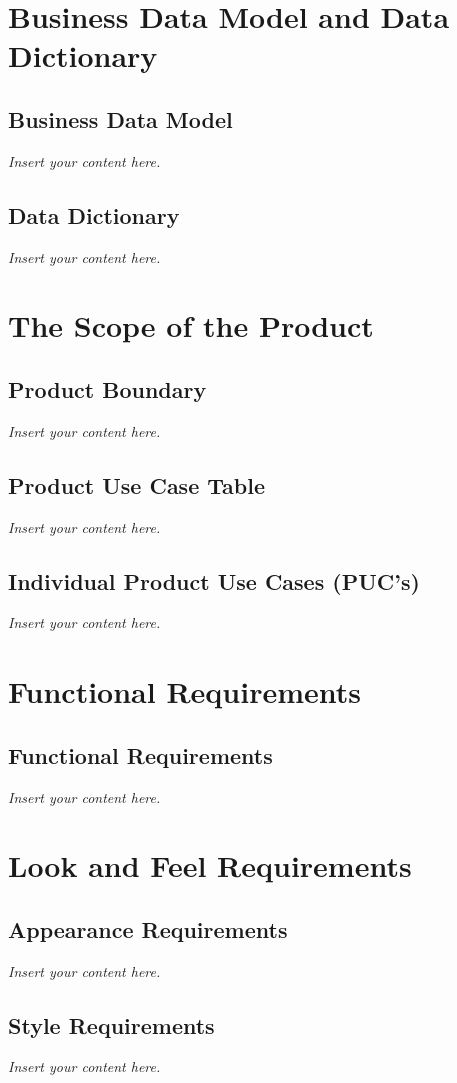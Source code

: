 \documentclass[12pt]{article}
\newcommand{\lips}{\textit{Insert your content here.}}
\begin{document}
\section{Business Data Model and Data Dictionary}
\subsection{Business Data Model}
\lips
\subsection{Data Dictionary}
\lips

\section{The Scope of the Product}
\subsection{Product Boundary}
\lips
\subsection{Product Use Case Table}
\lips
\subsection{Individual Product Use Cases (PUC's)}
\lips

\section{Functional Requirements}
\subsection{Functional Requirements} 

\lips

\section{Look and Feel Requirements}
\subsection{Appearance Requirements}
\lips
\subsection{Style Requirements}
\lips
\end{document}
